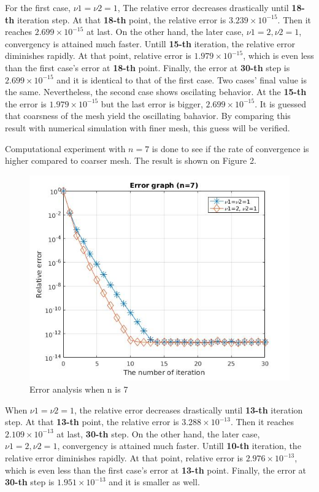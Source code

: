 \documentclass[12pt]{article}
\begin{document}
For the first case, $\nu1=\nu2=1$, The relative error decreases drastically until \textbf{18-th} iteration step. At that \textbf{18-th} point, the relative error is $3.239\times10^{-15}$. Then it reaches $2.699\times10^{-15}$ at last. On the other hand, the later case, $\nu1=2, \nu2=1$, convergency is attained much faster. Untill \textbf{15-th} iteration, the relative error diminishes rapidly. At that point, relative error is $1.979\times10^{-15}$, which is even less than the first case's error at \textbf{18-th} point. Finally, the error at \textbf{30-th} step is $2.699\times10^{-15}$ and it is identical to that of the first case. Two cases' final value is the same. Nevertheless, the second case shows oscilating behavior. At the \textbf{15-th} the error is $1.979\times10^{-15}$ but the last error is bigger, $2.699\times10^{-15}$. It is guessed that coarsness of the mesh yield the oscillating bahavior. By comparing this result with numerical simulation with finer mesh, this guess will be verified.   

Computational experiment with $n=7$ is done to see if the rate of convergence is higher compared to coarser mesh. The result is shown on Figure 2.

\begin{figure}[H]
\centering
\includegraphics[scale=0.7]{err7.jpg}
\caption{Error analysis when n is 7}
\end{figure}

When $\nu1=\nu2=1$, the relative error decreases drastically until \textbf{13-th} iteration step. At that \textbf{13-th} point, the relative error is $3.288\times10^{-13}$. Then it reaches $2.109\times10^{-13}$ at last, \textbf{30-th} step. On the other hand, the later case, $\nu1=2, \nu2=1$, convergency is attained much faster. Untill \textbf{10-th} iteration, the relative error diminishes rapidly. At that point, relative error is $2.976\times10^{-13}$, which is even less than the first case's error at \textbf{13-th} point. Finally, the error at \textbf{30-th} step is $1.951\times10^{-13}$ and it is smaller as well.  
\end{document}
